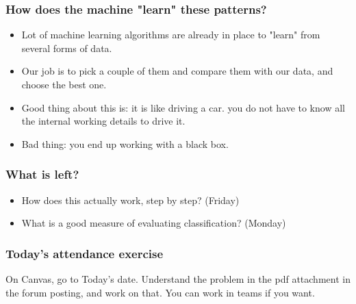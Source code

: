 \documentclass{beamer}
\begin{document}
\begin{frame}
\frametitle{How does the machine "learn" these patterns?}
\begin{itemize}
\item Lot of machine learning algorithms are already in place to "learn" from several forms of data.
\item Our job is to pick a couple of them and compare them with our data, and choose the best one. \pause
\item Good thing about this is: it is like driving a car. you do not have to know all the internal working details to drive it.
\item Bad thing: you end up working with a black box.
\end{itemize}
\end{frame}

\begin{frame}
\frametitle{What is left?}
\begin{itemize}
\item How does this actually work, step by step? (Friday)
\item What is a good measure of evaluating classification? (Monday)
\end{itemize}
\end{frame}

\begin{frame}
\frametitle{Today's attendance exercise}
On Canvas, go to Today's date. Understand the problem in the pdf attachment in the forum posting, and work on that. You can work in teams if you want.
\end{frame}
\end{document}

